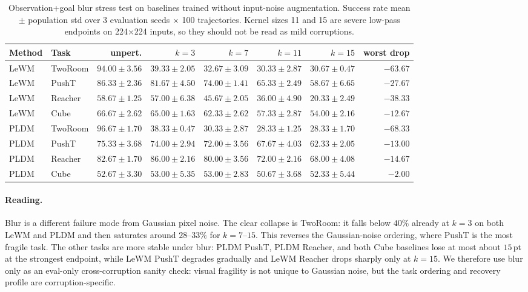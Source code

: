 \documentclass[10pt]{article}
\begin{document}
\begin{landscape}
\begin{table}[p]
\centering
\caption{Observation+goal blur stress test on baselines trained without input-noise augmentation. Success rate mean $\pm$ population std over 3 evaluation seeds $\times$ 100 trajectories. Kernel sizes 11 and 15 are severe low-pass endpoints on 224$\times$224 inputs, so they should not be read as mild corruptions.}
\label{tab:blur-baselines}
\small
\setlength{\tabcolsep}{5pt}
\begin{tabular}{llrrrrrr}
\toprule
Method & Task & unpert. & $k=3$ & $k=7$ & $k=11$ & $k=15$ & worst drop \\
\midrule
LeWM & TwoRoom & $94.00 \pm 3.56$ & $39.33 \pm 2.05$ & $32.67 \pm 3.09$ & $30.33 \pm 2.87$ & $30.67 \pm 0.47$ & $-63.67$ \\
LeWM & PushT   & $86.33 \pm 2.36$ & $81.67 \pm 4.50$ & $74.00 \pm 1.41$ & $65.33 \pm 2.49$ & $58.67 \pm 6.65$ & $-27.67$ \\
LeWM & Reacher & $58.67 \pm 1.25$ & $57.00 \pm 6.38$ & $45.67 \pm 2.05$ & $36.00 \pm 4.90$ & $20.33 \pm 2.49$ & $-38.33$ \\
LeWM & Cube    & $66.67 \pm 2.62$ & $65.00 \pm 1.63$ & $62.33 \pm 2.62$ & $57.33 \pm 2.87$ & $54.00 \pm 2.16$ & $-12.67$ \\
PLDM & TwoRoom & $96.67 \pm 1.70$ & $38.33 \pm 0.47$ & $30.33 \pm 2.87$ & $28.33 \pm 1.25$ & $28.33 \pm 1.70$ & $-68.33$ \\
PLDM & PushT   & $75.33 \pm 3.68$ & $74.00 \pm 2.94$ & $72.00 \pm 3.56$ & $67.67 \pm 4.03$ & $62.33 \pm 2.05$ & $-13.00$ \\
PLDM & Reacher & $82.67 \pm 1.70$ & $86.00 \pm 2.16$ & $80.00 \pm 3.56$ & $72.00 \pm 2.16$ & $68.00 \pm 4.08$ & $-14.67$ \\
PLDM & Cube    & $52.67 \pm 3.30$ & $53.00 \pm 5.35$ & $53.00 \pm 2.83$ & $50.67 \pm 3.68$ & $52.33 \pm 5.44$ & $-2.00$ \\
\bottomrule
\end{tabular}%
\end{table}
\end{landscape}

\paragraph{Reading.} Blur is a different failure mode from Gaussian pixel noise. The clear collapse is TwoRoom: it falls below $40\%$ already at $k=3$ on both LeWM and PLDM and then saturates around $28$--$33\%$ for $k=7$--$15$. This reverses the Gaussian-noise ordering, where PushT is the most fragile task. The other tasks are more stable under blur: PLDM PushT, PLDM Reacher, and both Cube baselines lose at most about $15$\,pt at the strongest endpoint, while LeWM PushT degrades gradually and LeWM Reacher drops sharply only at $k=15$. We therefore use blur only as an eval-only cross-corruption sanity check: visual fragility is not unique to Gaussian noise, but the task ordering and recovery profile are corruption-specific.
\end{document}
